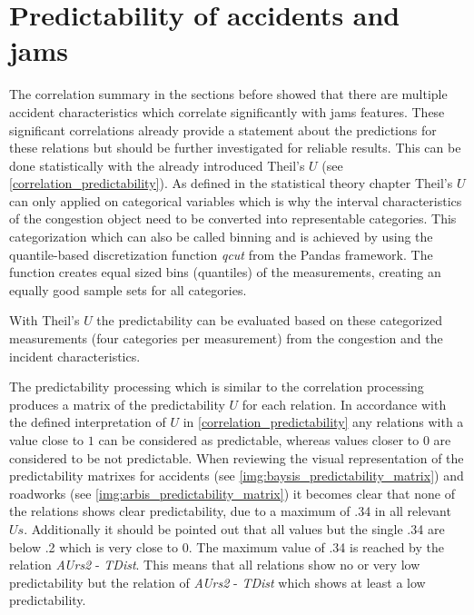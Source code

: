 \section{Predictability of accidents and jams}
\label{analysis_summary_predictability}
The correlation summary in the sections before showed that there are multiple accident characteristics which correlate significantly with jams features. These significant correlations already provide a statement about the predictions for these relations but should be further investigated for reliable results. This can be done statistically with the already introduced Theil's $U$ (see \cref{correlation_predictability}). As defined in the statistical theory chapter Theil's $U$ can only applied on categorical variables which is why the interval characteristics of the congestion object need to be converted into representable categories. This categorization which can also be called binning and is achieved by using the quantile-based discretization function \textit{qcut} from the Pandas framework. The function creates equal sized bins (quantiles) of the measurements, creating an equally good sample sets for all categories. 

With Theil's $U$ the predictability can be evaluated based on these categorized measurements (four categories per measurement) from the congestion and the incident characteristics.

The predictability processing which is similar to the correlation processing produces a matrix of the predictability $U$ for each relation. In accordance with the defined interpretation of $U$ in \cref{correlation_predictability} any relations with a value close to $1$ can be considered as predictable, whereas values closer to $0$ are considered to be not predictable. When reviewing the visual representation of the predictability matrixes for accidents (see \cref{img:baysis_predictability_matrix}) and roadworks (see \cref{img:arbis_predictability_matrix}) it becomes clear that none of the relations shows clear predictability, due to a maximum of .34 in all relevant $Us$. Additionally it should be pointed out that all values but the single .34 are below .2 which is very close to $0$. The maximum value of .34 is reached by the relation \textit{AUrs2} - \textit{TDist}. This means that all relations show no or very low predictability but the relation of \textit{AUrs2} - \textit{TDist} which shows at least a low predictability.
